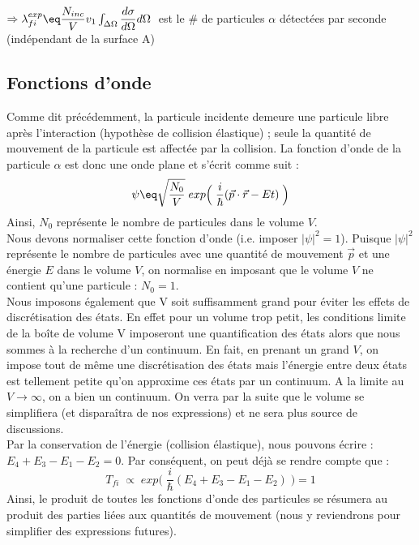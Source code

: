 $\Rightarrow \lambda^{exp}_{fi} \eq \dfrac{N_{inc}}{V}v_1\int_{\Delta \Omega}\dfrac{d\sigma}{d\Omega}d\Omega \;$  est le \# de particules $\alpha$ détectées par seconde (indépendant de la surface A)


\subsection{Fonctions d'onde}\label{fct_onde}


Comme dit précédemment, la particule incidente demeure une particule libre après l'interaction (hypothèse de collision élastique) ; seule la quantité de mouvement de la particule est affectée par la collision. La fonction d'onde de la particule $\alpha$ est donc une onde plane et s'écrit comme suit :
\begin{equation*}
    \psi \eq \sqrt{\frac{N_0}{V}} \; exp\Big( \;\frac{i}{\hbar}(\vec{p}\cdot\vec{r} - Et) \; \Big)
\end{equation*}
Ainsi, $N_0$ représente le nombre de particules dans le volume $V$.\\
Nous devons normaliser cette fonction d'onde (i.e. imposer $|\psi|^2 = 1$). Puisque $|\psi|^2$ représente le nombre de particules avec une quantité de mouvement $\vec{p}$ et une énergie $E$ dans le volume $V$, on normalise en imposant que le volume $V$ ne contient qu'une particule : $N_0 = 1$.\\

Nous imposons également que V soit suffisamment grand pour éviter les effets de discrétisation des états. En effet pour un volume trop petit, les conditions limite de la boîte de volume V imposeront une quantification des états alors que nous sommes à la recherche d'un continuum. En fait, en prenant un grand $V$, on impose tout de même une discrétisation des états mais l'énergie entre deux états est tellement petite qu'on approxime ces états par un continuum. A la limite au $V \rightarrow \infty$, on a bien un continuum. On verra par la suite que le volume se simplifiera (et disparaîtra de nos expressions) et ne sera plus source de discussions.\\

Par la conservation de l'énergie (collision élastique), nous pouvons écrire : $E_4 + E_3 - E_1 - E_2 = 0$. Par conséquent, on peut déjà se rendre compte que :
\begin{equation*}
    T_{fi} \; \propto \; exp\Big( \;\frac{i}{\hbar} (E_4 + E_3 - E_1 - E_2) \; \Big) = 1
\end{equation*}
Ainsi, le produit de toutes les fonctions d'onde des particules se résumera au produit des parties liées aux quantités de mouvement (nous y reviendrons pour simplifier des expressions futures).


